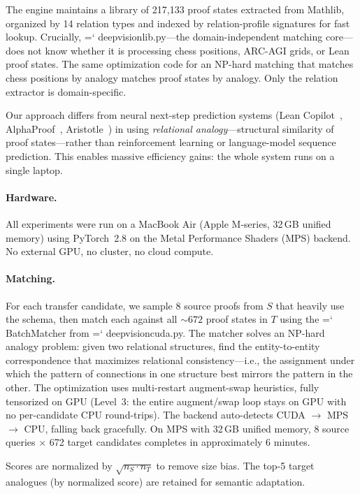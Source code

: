\documentclass[11pt]{article}
\renewcommand{\texttt}[1]{%
  \begingroup\ttfamily\hyphenchar\font=`\-\relax
  \def\_{\textunderscore\discretionary{}{}{}}%
  #1\endgroup}
\theoremstyle{definition}
\theoremstyle{remark}
\begin{document}
The engine maintains a library of 217{,}133 proof states extracted from
Mathlib, organized by 14 relation types and indexed by
relation-profile signatures for fast lookup.  Crucially,
\texttt{deep\_vision\_lib.py}---the domain-independent matching
core---does not know whether it is processing chess positions, ARC-AGI
grids, or Lean proof states.  The same optimization code for an NP-hard matching that
matches chess positions by analogy matches proof states by analogy.
Only the relation extractor is domain-specific.

Our approach differs from neural next-step prediction systems (Lean
Copilot~\cite{song2024}, AlphaProof~\cite{alphaproof2025},
Aristotle~\cite{aristotle2025}) in using \emph{relational
analogy}---structural similarity of proof states---rather than
reinforcement learning or language-model sequence prediction.  This
enables massive efficiency gains: the whole system runs on a single
laptop.

\paragraph{Hardware.}  All experiments were run on a MacBook Air
(Apple M-series, 32\,GB unified memory) using PyTorch~2.8 on the
Metal Performance Shaders (MPS) backend.  No external GPU, no cluster,
no cloud compute.

\paragraph{Matching.}  For each transfer candidate, we sample 8 source
proofs from $S$ that heavily use the schema, then match each against
all ${\sim}672$ proof states in $T$ using the \texttt{BatchMatcher}
from \texttt{deep\_vision\_cuda.py}.  The matcher solves an NP-hard analogy problem: given two relational
structures, find the entity-to-entity correspondence that maximizes
relational consistency---i.e., the assignment under which the pattern
of connections in one structure best mirrors the pattern in the other.
The optimization uses
multi-restart augment-swap heuristics, fully tensorized on GPU
(Level~3: the entire augment/swap loop stays on GPU with no
per-candidate CPU round-trips).  The backend auto-detects
CUDA $\to$ MPS $\to$ CPU, falling back gracefully.  On MPS with
32\,GB unified memory, 8 source queries $\times$ 672 target candidates
completes in approximately 6 minutes.

Scores are normalized by $\sqrt{n_S \cdot n_T}$ to remove size bias.
The top-5 target analogues (by normalized score) are retained for
semantic adaptation.
\end{document}
